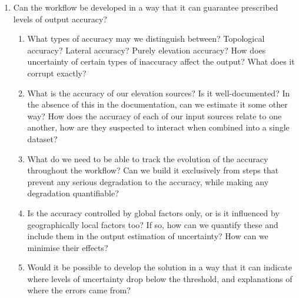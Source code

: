 \begin{enumerate}
\begin{enumerate}
    \end{enumerate}
    \item Can the workflow be developed in a way that it can guarantee prescribed levels of output accuracy?
    \begin{enumerate}
        \item What types of accuracy may we distinguish between? Topological accuracy? Lateral accuracy? Purely elevation accuracy? How does uncertainty of certain types of inaccuracy affect the output? What does it corrupt exactly?
        \item What is the accuracy of our elevation sources? Is it well-documented? In the absence of this in the documentation, can we estimate it some other way?
        \tiem How does the accuracy of each of our input sources relate to one another, how are they suspected to interact when combined into a single dataset?
        \item What do we need to be able to track the evolution of the accuracy throughout the workflow? Can we build it exclusively from steps that prevent any serious degradation to the accuracy, while making any degradation quantifiable?
        \item Is the accuracy controlled by global factors only, or is it influenced by geographically local factors too? If so, how can we quantify these and include them in the output estimation of uncertainty? How can we minimise their effects?
        \item Would it be possible to develop the solution in a way that it can indicate where levels of uncertainty drop below the threshold, and explanations of where the errors came from?
        
    \end{enumerate}
\end{enumerate}